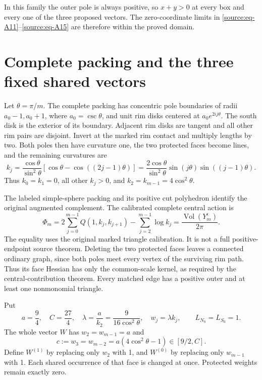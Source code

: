 \documentclass[11pt]{article}
\numberwithin{equation}{section}
\begin{document}
In this family the outer pole is always positive, so \(x+y>0\) at every
box and every one of the three proposed vectors. The zero-coordinate
limits in \eqref{source:eq-A11}--\eqref{source:eq-A15} are therefore within the proved domain.

\section{Complete packing and the three fixed shared
vectors}\label{source:sec-4}

Let \(\theta=\pi/m\). The complete packing has concentric pole
boundaries of radii \(a_0-1,a_0+1\), where \(a_0=\csc\theta\), and unit
rim disks centered at \(a_0e^{2ij\theta}\). The south disk is the
exterior of its boundary. Adjacent rim disks are tangent and all other
rim pairs are disjoint. Invert at the marked rim contact and multiply
lengths by two. Both poles then have curvature one, the two protected
faces become lines, and the remaining curvatures are \begin{equation}\label{source:eq-A17}
k_j=\frac{\cos\theta}{\sin^2\theta}
       [\cos\theta-\cos((2j-1)\theta)]
 =\frac{2\cos\theta}{\sin^2\theta}
              \sin(j\theta)\sin((j-1)\theta).
\end{equation} Thus \(k_0=k_1=0\), all other \(k_j>0\), and
\(k_2=k_{m-1}=4\cos^2\theta\).

The labeled simple-sphere packing and its positive cut polyhedron
identify the original augmented complement. The calibrated complete
central action is \begin{equation}\label{source:eq-A18}
\Phi_m=2\sum_{j=0}^{m-1}Q(1,k_j,k_{j+1})
              -\sum_{j=2}^{m-1}\log k_j
        =\frac{\operatorname{Vol}(Y_m^\epsilon)}{2\pi}.
\end{equation} The equality uses the original marked triangle calibration. It is not
a full positive-endpoint source theorem. Deleting the two protected
faces leaves a connected ordinary graph, since both poles meet every
vertex of the surviving rim path. Thus its face Hessian has only the
common-scale kernel, as required by the central-contribution theorem. Every
matched edge has a positive outer and at least one nonmonomial triangle.

Put \begin{equation}\label{source:eq-A19}
a=\frac94,\quad C=\frac{27}4,\quad
 \lambda=\frac{a}{k_2}=\frac9{16\cos^2\theta},\quad
 w_j=\lambda k_j,
 \qquad L_{N_0}=L_{S_0}=1.
\end{equation} The whole vector \(W\) has \(w_2=w_{m-1}=a\) and \begin{equation}\label{source:eq-A20}
c:=w_3=w_{m-2}=a(4\cos^2\theta-1)\in[9/2,C].
\end{equation} Define \(W^{(1)}\) by replacing only \(w_2\) with 1, and \(W^{(0)}\)
by replacing only \(w_{m-1}\) with 1. Each shared occurrence of that
face is changed at once. Protected weights remain exactly zero.
\end{document}
